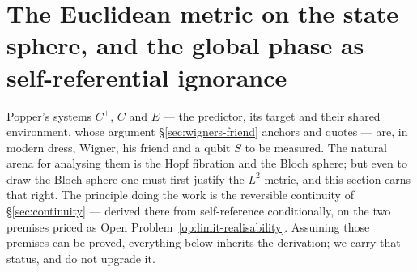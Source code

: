 %
%      
%      
%      
%
%

\section{The Euclidean metric on the state sphere, and the global phase as
self-referential ignorance}
\label{sec:l2-metric-fibre}
Popper's systems $C^{+}$, $C$ and $E$ --- the predictor, its target and their shared environment,
whose argument \S\ref{sec:wigners-friend} anchors and quotes --- are, in modern dress, Wigner, his
friend and a qubit $S$ to be measured. The natural arena for analysing them is the Hopf fibration
and the Bloch sphere; but even to draw the Bloch sphere one must first justify the $L^{2}$ metric,
and this section earns that right. The principle doing the work is the reversible continuity of
\S\ref{sec:continuity} --- derived there from self-reference conditionally, on the two premises
priced as Open Problem~\ref{op:limit-realisability}. Assuming those premises can be proved,
everything below inherits the derivation; we carry that status, and do not upgrade it.

